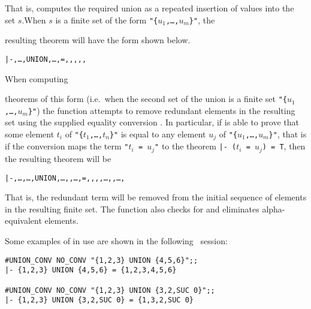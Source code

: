 \noindent That is,  computes the required union as a repeated
insertion of values into the set {\small$s$}.\pagebreak[3] When {\small$s$} is
a finite set of the form {\small\verb!"{!\tt$u_1$,\dots,$u_m$\verb!}"!}, the
{\samepage resulting theorem will have the form shown below.

\begin{hol}
\begin{alltt}
   |- \lb{},\dots,\rb UNION \lb{},\dots,\rb = \lb{},\m{\dots},,,\m{\dots},\rb
\end{alltt}\end{hol}

\noindent When computing} theorems of this form (i.e.\ when the second set of
the union is a finite set {\small\verb!"{!\tt$u_1$,\dots,$u_m$\verb!}"!}) the
function  attempts to remove redundant elements in the
resulting set using the supplied equality conversion .  In particular,
if  is able to prove that some element {\small$t_i$} of
{\small\verb!"{!\tt$t_1$,\dots,$t_n$\verb!}"!} is equal to any element
{\small$u_j$} of {\small\verb!"{!\tt$u_1$,\dots,$u_m$\verb!}"!}, that is if the
conversion  maps the term {\small\verb!"!$t_i$\verb! = !$u_j$\verb!"!}
to the theorem {\small\verb!|- (!$t_i$\verb! = !$u_j$\verb!) = T!}, then the
resulting theorem will be

\begin{hol}
\begin{alltt}
   |- \lb{},\dots{},\dots,\rb UNION \lb{},\dots,,\dots,\rb = \lb{},\m{\dots},,,\dots,,\dots,\rb
\end{alltt}\end{hol}

\noindent That is, the redundant term  will be removed from the initial
sequence of elements in the resulting finite set.  The function
 also checks for and eliminates alpha-equivalent elements.

Some examples of  in use are shown in the following \HOL\
session:

\begin{session}
\begin{verbatim}
#UNION_CONV NO_CONV "{1,2,3} UNION {4,5,6}";;
|- {1,2,3} UNION {4,5,6} = {1,2,3,4,5,6}

#UNION_CONV NO_CONV "{1,2,3} UNION {3,2,SUC 0}";;
|- {1,2,3} UNION {3,2,SUC 0} = {1,3,2,SUC 0}
\end{verbatim}\end{session}

